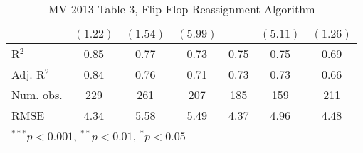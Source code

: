 \documentclass[12pt]{article}
\begin{document}
\begin{table}
\begin{center}
\begin{tabular}{l c c c c c c }
            & $(1.22)$     & $(1.54)$      & $(5.99)$       &              & $(5.11)$       & $(1.26)$      \\
            \hline
            R$^2$                  & 0.85         & 0.77          & 0.73           & 0.75         & 0.75           & 0.69          \\
            Adj. R$^2$             & 0.84         & 0.76          & 0.71           & 0.73         & 0.73           & 0.66          \\
            Num. obs.              & 229          & 261           & 207            & 185          & 159            & 211           \\
            RMSE                   & 4.34         & 5.58          & 5.49           & 4.37         & 4.96           & 4.48          \\
            \hline
            \multicolumn{7}{l}{\scriptsize{$^{***}p<0.001$, $^{**}p<0.01$, $^*p<0.05$}}
		\end{tabular}
\caption{MV 2013 Table 3, Flip Flop Reassignment Algorithm}
\end{center}
\end{table}
\end{document}
